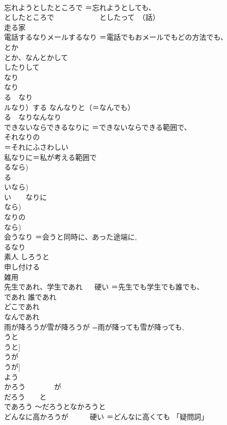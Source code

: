 \documentclass[8pt]{extreport}
\begin{document}
\begin{CJK}{UTF8}{min}
\\	忘れようとしたところで	＝忘れようとしても、
\\	としたところで 　　　　　　としたって　（話）
\\	走る家	
\\	電話するなりメールするなり	＝電話でもおメールでもどの方法でも、
\\	とか
\\	とか、なんとかして 
\\	したりして 
\\	なり　
\\	なり 
\\	る　なり
\\	ルなり）する なんなりと（＝なんでも） 
\\	る　なりなんなり
\\	できないならできるなりに	＝できないならできる範囲で、
\\	それなりの
\\	＝それにふさわしい
\\	私なりに＝私が考える範囲で 
\\	るなら)
\\	る 
\\	いなら)
\\	い　　なりに 
\\	なら)
\\	なりの
\\	なら)
\\	会うなり	＝会うと同時に、あった途端に, 
\\	るなり
\\	素人	しろうと 
\\	申し付ける	
\\	雑用	
\\	先生であれ、学生であれ 　 硬い	＝先生でも学生でも誰でも、
\\	であれ 誰であれ 
\\	どこであれ 
\\	なんであれ 
\\	雨が降ろうが雪が降ろうが	=雨が降っても雪が降っても, 
\\	うと
\\	うと] 
\\	うが
\\	うが] 
\\	よう 
\\	かろう　　　　が 
\\	だろう　　と 
\\	であろう 〜だろうとなかろうと
\\	どんなに高かろうが　　　硬い	＝どんなに高くても 「疑問詞」　

\end{CJK}
\end{document}
